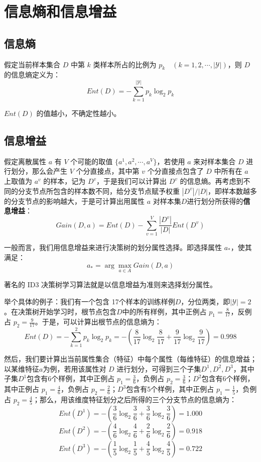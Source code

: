 \documentclass[12pt]{article}
\begin{document}
\section{信息熵和信息增益\cite{Book_Machine_Learning_ZhouZhihua}}
\subsection{信息熵}
假定当前样本集合 $D$ 中第 $k$ 类样本所占的比例为 $p_k \quad (k = 1, 2, \cdots, |\mathcal{Y}|)$，则 $D$ 的信息熵定义为：
$$
Ent(D) = -\sum_{k=1}^{|\mathcal{Y}|}p_k\log_2{p_k}
$$

$Ent(D)$ 的值越小，不确定性越小。

\subsection{信息增益}
假定离散属性 $a$ 有 $V$ 个可能的取值 $\{a^1, a^2, \cdots, a^V\}$，若使用 $a$ 来对样本集合 $D$ 进行划分，那么会产生 $V$ 个分直接点，其中第 $v$ 个分直接点包含了 $D$ 中所有在 $a$  上取值为 $a^v$ 的样本，记为 $D^v$，于是我们可以计算出 $D^v$ 的信息熵。再考虑到不同的分支节点所包含的样本数不同，给分支节点赋予权重 $|D^v|/|D|$，即样本数越多的分支节点的影响越大，于是可计算出用属性 $a$ 对样本集$D$进行划分所获得的\textbf{信息增益}：
$$
Gain(D, a) = Ent(D) - \sum_{v=1}^{V}\frac{|D^v|}{|D|}Ent(D^v)
$$

一般而言，我们用信息增益来进行决策树的划分属性选择。即选择属性 $a_*$，使其满足：
$$
a_* = \arg\max_{a \in A}Gain(D,a)
$$

著名的 ID3 决策树学习算法就是以信息增益为准则来选择划分属性。

举个具体的例子：我们有一个包含 17个样本的训练样例$D$，分位两类，即$|\mathcal{Y}| = 2$。在决策树开始学习时，根节点包含$D$中的所有样例，其中正例占 $p_1 = \frac{8}{17}$，反例占 $p_2 = \frac{9}{17}$。于是，可以计算出根节点的信息熵为：
$$
Ent(D) = -\sum_{k=1}^2p_k\log_2{p_k} = -(\frac{8}{17}\log_2\frac{8}{17} + \frac{9}{17}\log_2\frac{9}{17}) = 0.998
$$

然后，我们要计算出当前属性集合（特征）中每个属性（每维特征）的信息增益；以某维特征$a$为例，若用该属性对 $D$ 进行划分，可得到三个子集$D^1, D^2, D^3$，其中子集$D^1$包含有6个样例，其中正例占 $p_1 = \frac{3}{6}$，负例占 $p_2 = \frac{3}{6}$；$D^2$包含有6个样例，其中正例占 $p_1 = \frac{4}{6}$，负例占 $p_2 = \frac{2}{6}$；$D^3$包含有5个样例，其中正例占 $p_1 = \frac{1}{5}$，负例占 $p_2 = \frac{4}{5}$；那么，用该维度特征划分之后所得的三个分支节点的信息熵为：
$$
Ent(D^1) = -(\frac{3}{6}\log_2\frac{3}{6} + \frac{3}{6}\log_2\frac{3}{6}) = 1.000
$$
$$
Ent(D^2) = -(\frac{4}{6}\log_2\frac{4}{6} + \frac{2}{6}\log_2\frac{2}{6}) = 0.918
$$
$$
Ent(D^3) = -(\frac{1}{5}\log_2\frac{1}{5} + \frac{4}{5}\log_2\frac{4}{5}) = 0.722
$$
\end{document}
